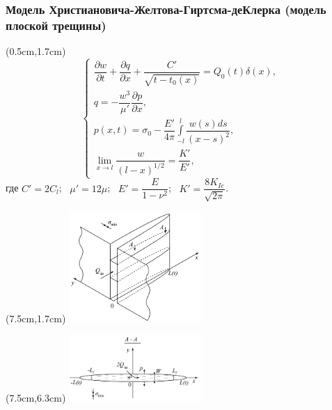\documentclass{beamer}
\begin{document}
\begin{frame}
\frametitle{Модель Христиановича-Желтова-Гиртсма-деКлерка (модель плоской трещины)}

\begin{textblock*}{7cm}(0.5cm,1.7cm)
$$
\begin{cases}
\dfrac{\partial w}{\partial t}+\dfrac{\partial q}{\partial x}+\dfrac{C'}{\sqrt{t-t_0(x)}}=Q_0(t)\delta(x),\\[15pt]
q=-\dfrac{w^3}{\mu'}\dfrac{\partial p}{\partial x},\\[5pt]
p(x,t)=\sigma_0-\dfrac{E'}{4\pi}\displaystyle\int\limits_{-l}^{l}\dfrac{w(s)ds}{(x-s)^2},\\[20pt]
\displaystyle\lim_{x\to l}\dfrac{w}{(l-x)^{1/2}}=\dfrac{K'}{E'},
\end{cases}
$$
где $C'=2C_l$; $\,\,\,\mu'=12\mu$; $\,\,\,E'=\dfrac{E}{1-\nu^2}$; $\,\,\,K'=\dfrac{8K_{Ic}}{\sqrt{2\pi}}$.
\end{textblock*}

\begin{textblock*}{7cm}(7.5cm,1.7cm)
\includegraphics[width=5cm]{kgd_model_3D.jpg}
\end{textblock*}

\begin{textblock*}{7cm}(7.5cm,6.3cm)
\includegraphics[width=5cm]{kgd_model_A-A_plane.jpg}
\end{textblock*}

\end{frame}
\end{document}
